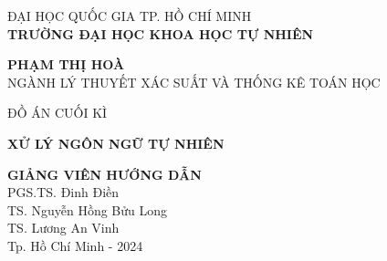 \begin{center}
\fontsize{14}{16}\selectfont
{ĐẠI HỌC QUỐC GIA TP. HỒ CHÍ MINH}\\
{\bf TRƯỜNG ĐẠI HỌC KHOA HỌC TỰ NHIÊN}\\

\hfill

\vspace*{2cm}

\fontsize{14}{16}\selectfont
{\bf  PHẠM THỊ HOÀ}\\
{NGÀNH LÝ THUYẾT XÁC SUẤT VÀ THỐNG KÊ TOÁN HỌC}

\vspace*{3cm}
\fontsize{20}{22}\selectfont
{ĐỒ ÁN CUỐI KÌ }

\vspace*{1cm}
\fontsize{24}{22}\selectfont
{\bf XỬ LÝ NGÔN NGỮ TỰ NHIÊN}

\vspace*{3cm}
\fontsize{13}{16}\selectfont
{\bf GIẢNG VIÊN HƯỚNG DẪN}\\
PGS.TS. Đinh Điền\\
TS. Nguyễn Hồng Bửu Long\\
TS. Lương An Vinh\\




\vfill
\fontsize{12}{16}\selectfont
{Tp. Hồ Chí Minh - 2024}
\end{center}

